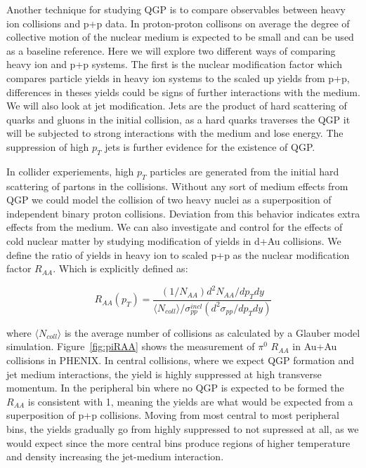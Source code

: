 Another technique for studying QGP is to compare observables between heavy ion collisions and p+p data. In proton-proton collisons on average the degree of collective motion of the nuclear medium is expected to be small and can be used as a baseline reference. Here we will explore two different ways of comparing heavy ion and p+p systems. The first is the nuclear modification factor which compares particle yields in  heavy ion systems to the scaled up yields from p+p, differences in theses yields could be signs of further interactions with the medium. We will also look at jet modification. Jets are the product of hard scattering of quarks and gluons in the initial collision, as a hard quarks traverses the QGP it will be subjected to strong interactions with the medium and lose energy. The suppression of high $p_T$ jets is further evidence for the existence of QGP.

In collider experiements, high $p_T$ particles are generated from the initial hard scattering of partons in the collisions. Without any sort of medium effects from QGP we could model the collision of two heavy nuclei as a superposition of independent binary proton collisions. Deviation from this behavior indicates extra effects from the medium. We can also investigate and control for the effects of cold nuclear matter by studying modification of yields in d+Au collisions. We define the ratio of yields in heavy ion to scaled p+p as the nuclear modification factor $R_{AA}$. Which is explicitly defined as:

\begin{equation}\label{eq:RAAdef}
R_{AA}(p_T) = \frac{(1/N_{AA}) d^2N_{AA}/dp_Tdy}{\langle N_{coll} \rangle/\sigma^{incl}_{pp}(d^2\sigma_{pp}/dp_Tdy)} 
\end{equation}

where $ \langle N_{coll} \rangle $ is the average number of collisions as calculated by a Glauber model simulation. Figure~\ref{fig:piRAA} shows the measurement of $\pi^0$ $ R_{AA}$ in Au+Au collisions in PHENIX. In central collisions, where we expect QGP formation and jet medium interactions, the yield is highly suppressed at high transverse momentum. In the peripheral bin where no QGP is expected to be formed the $R_{AA}$ is consistent with 1, meaning the yields are what would be expected from a superposition of p+p collisions. Moving from most central to most peripheral bins, the yields gradually go from highly suppressed to not supressed at all, as we would expect since the more central bins produce regions of higher temperature and density increasing the jet-medium interaction.

